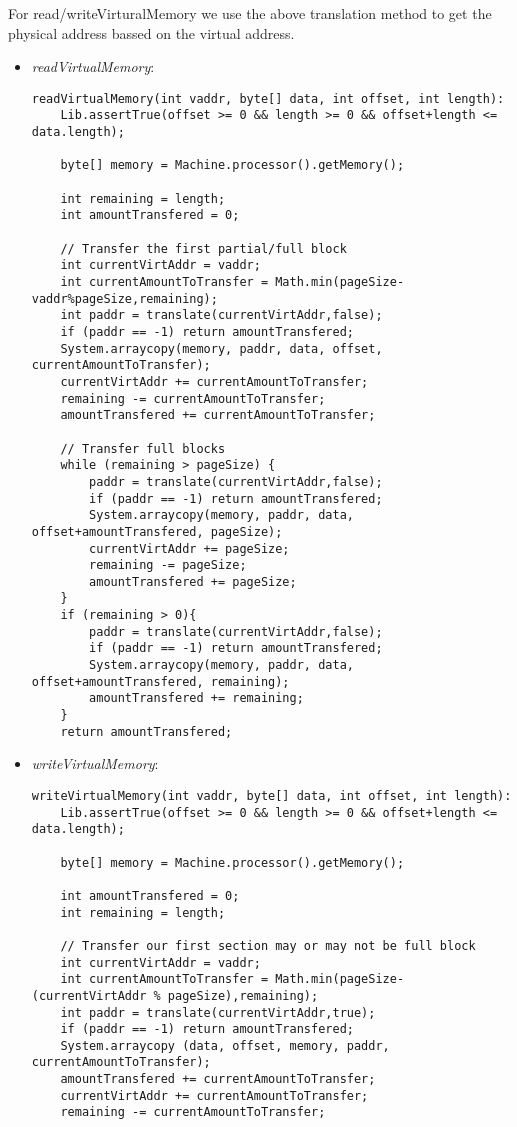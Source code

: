\documentclass{article}
\begin{document}
For read/writeVirturalMemory we use the above translation method to get the physical address bassed on the virtual address.
\begin{itemize}
\item \textit{readVirtualMemory}:
\begin{verbatim}
readVirtualMemory(int vaddr, byte[] data, int offset, int length):
    Lib.assertTrue(offset >= 0 && length >= 0 && offset+length <= data.length);

    byte[] memory = Machine.processor().getMemory();

    int remaining = length;
    int amountTransfered = 0;

    // Transfer the first partial/full block
    int currentVirtAddr = vaddr;
    int currentAmountToTransfer = Math.min(pageSize-vaddr%pageSize,remaining);
    int paddr = translate(currentVirtAddr,false);
    if (paddr == -1) return amountTransfered;
    System.arraycopy(memory, paddr, data, offset, currentAmountToTransfer);
    currentVirtAddr += currentAmountToTransfer;
    remaining -= currentAmountToTransfer;
    amountTransfered += currentAmountToTransfer;

    // Transfer full blocks
    while (remaining > pageSize) {
        paddr = translate(currentVirtAddr,false);
        if (paddr == -1) return amountTransfered;
        System.arraycopy(memory, paddr, data, offset+amountTransfered, pageSize);
        currentVirtAddr += pageSize;
        remaining -= pageSize;
        amountTransfered += pageSize;
    }
    if (remaining > 0){
        paddr = translate(currentVirtAddr,false);
        if (paddr == -1) return amountTransfered;
        System.arraycopy(memory, paddr, data, offset+amountTransfered, remaining);
        amountTransfered += remaining;
    }
    return amountTransfered;
\end{verbatim}
 
\item \textit{writeVirtualMemory}:
\begin{verbatim}
writeVirtualMemory(int vaddr, byte[] data, int offset, int length):
    Lib.assertTrue(offset >= 0 && length >= 0 && offset+length <= data.length);

    byte[] memory = Machine.processor().getMemory();

    int amountTransfered = 0;
    int remaining = length;

    // Transfer our first section may or may not be full block
    int currentVirtAddr = vaddr;
    int currentAmountToTransfer = Math.min(pageSize-(currentVirtAddr % pageSize),remaining);
    int paddr = translate(currentVirtAddr,true);
    if (paddr == -1) return amountTransfered;
    System.arraycopy (data, offset, memory, paddr, currentAmountToTransfer);
    amountTransfered += currentAmountToTransfer;
    currentVirtAddr += currentAmountToTransfer;
    remaining -= currentAmountToTransfer;


\end{verbatim}
\end{itemize}
\end{document}
